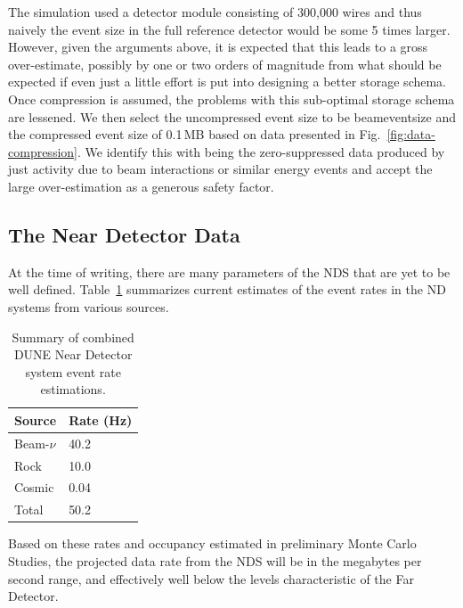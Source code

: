 The simulation used a detector module consisting of 300,000 wires and thus naively the event
size in the full reference detector would be some 5 times larger.
However, given the arguments above, it is expected that this leads to
a gross over-estimate, possibly by one or two orders of magnitude from
what should be expected if even just a little effort is put into
designing a better storage schema.
Once compression is assumed, the problems with this sub-optimal
storage schema are lessened.
We then select the uncompressed event size to be beameventsize and
the compressed event size of 0.1\,MB based
on data presented in Fig.~\ref{fig:data-compression}.
We identify this with being the zero-suppressed data produced by just
activity due to beam interactions or similar energy events and accept
the large over-estimation as a generous safety factor.

\subsection{The Near Detector Data}
At the time of writing, there are many parameters of the NDS that are yet to be well defined.
Table~\ref{tab:nds-event-rates} summarizes current estimates of the event rates
in the ND systems from various sources.

\begin{table}[ht!]
\centering
\begin{tabular}{| p{0.8in} | p{0.8in} |}		\hline		
\textbf{Source} & \textbf{Rate} (Hz)\\ \hline
Beam-$\nu$ & 40.2 \\ \hline
Rock & 10.0 \\ \hline
Cosmic & 0.04 \\ \hline
Total & 50.2 \\ \hline
\end{tabular}
\caption{Summary of combined DUNE Near Detector system event rate estimations.}
\label{tab:nds-event-rates}
\end{table}

Based on these rates and occupancy estimated in preliminary Monte Carlo Studies, the projected
data rate from the NDS will be in the megabytes per second range, and effectively well below
the levels characteristic of the Far Detector.
